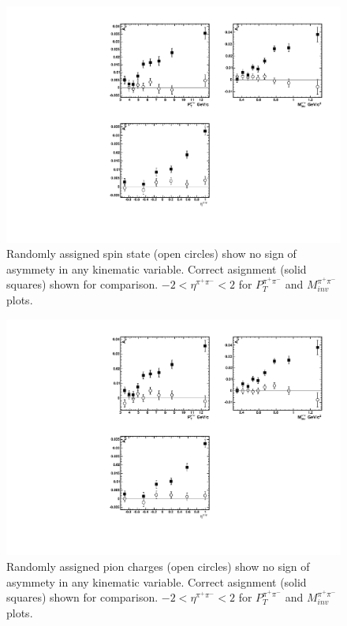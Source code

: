 \documentclass[abstract = on,listof=totoc, bibliography=totoc]{scrreprt}
\newcommand{\ptpair}{P_{T}^{\pi^+\pi^-}}
\newcommand{\mpair}{M_{inv}^{\pi^+\pi^-}}
\newcommand{\etapair}{\eta^{\pi^+\pi^-}}
\newcommand{\pip}{\pi^+}
\newcommand{\pim}{\pi^-}
\newcommand{\pair}{$\pip\pim$ }
\begin{document}
\begin{figure}
\begin{center}
\includegraphics[width = 1\textwidth]{randomSpin}
\caption[Asymmetry in \pair pairs when proton spin is randomly assigned]{Randomly assigned spin state (open circles) show no sign of asymmety in any kinematic variable. Correct asignment (solid squares) shown for comparison. $-2<\etapair<2$ for $\ptpair$ and $\mpair$ plots.}
\label{fig:randomSpin}
\end{center}
\end{figure}

\begin{figure}
\begin{center}
\includegraphics[width = 1\textwidth]{randomCharge}
\caption[Asymmetry in \pair pair with randomly assigned charges]{Randomly assigned pion charges (open circles) show no sign of asymmety in any kinematic variable. Correct asignment (solid squares) shown for comparison. $-2<\etapair<2$ for $\ptpair$ and $\mpair$ plots.}
\label{fig:randomCharge}
\end{center}
\end{figure}
\end{document}
